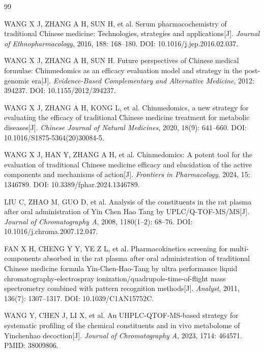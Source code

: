 \documentclass[12pt,a4paper,UTF8,scheme=chinese]{ctexart}
\begin{document}
\begingroup
\renewcommand{\section}[2]{}  %
\begin{thebibliography}{99}

WANG X J, ZHANG A H, SUN H, et al. Serum pharmacochemistry of traditional Chinese medicine: Technologies, strategies and applications[J]. \textit{Journal of Ethnopharmacology}, 2016, 188: 168--180. DOI: 10.1016/j.jep.2016.02.037.

WANG X J, ZHANG A H, SUN H. Future perspectives of Chinese medical formulae: Chinmedomics as an efficacy evaluation model and strategy in the post-genomic era[J]. \textit{Evidence-Based Complementary and Alternative Medicine}, 2012: 394237. DOI: 10.1155/2012/394237.

WANG X J, ZHANG A H, KONG L, et al. Chinmedomics, a new strategy for evaluating the efficacy of traditional Chinese medicine treatment for metabolic diseases[J]. \textit{Chinese Journal of Natural Medicines}, 2020, 18(9): 641--660. DOI: 10.1016/S1875-5364(20)30084-5.

WANG X J, HAN Y, ZHANG A H, et al. Chinmedomics: A potent tool for the evaluation of traditional Chinese medicine efficacy and elucidation of the active components and mechanisms of action[J]. \textit{Frontiers in Pharmacology}, 2024, 15: 1346789. DOI: 10.3389/fphar.2024.1346789.

LIU C, ZHAO M, GUO D, et al. Analysis of the constituents in the rat plasma after oral administration of Yin Chen Hao Tang by UPLC/Q-TOF-MS/MS[J]. \textit{Journal of Chromatography A}, 2008, 1180(1--2): 68--76. DOI: 10.1016/j.chroma.2007.12.047.

FAN X H, CHENG Y Y, YE Z L, et al. Pharmacokinetics screening for multi-components absorbed in the rat plasma after oral administration of traditional Chinese medicine formula Yin-Chen-Hao-Tang by ultra performance liquid chromatography-electrospray ionization/quadrupole-time-of-flight mass spectrometry combined with pattern recognition methods[J]. \textit{Analyst}, 2011, 136(7): 1307--1317. DOI: 10.1039/C1AN15752C.

WANG Y, CHEN J, LI X, et al. An UHPLC-QTOF-MS-based strategy for systematic profiling of the chemical constituents and in vivo metabolome of Yinchenhao decoction[J]. \textit{Journal of Chromatography A}, 2023, 1714: 464571. PMID: 38009806.


\end{thebibliography}
\end{document}
